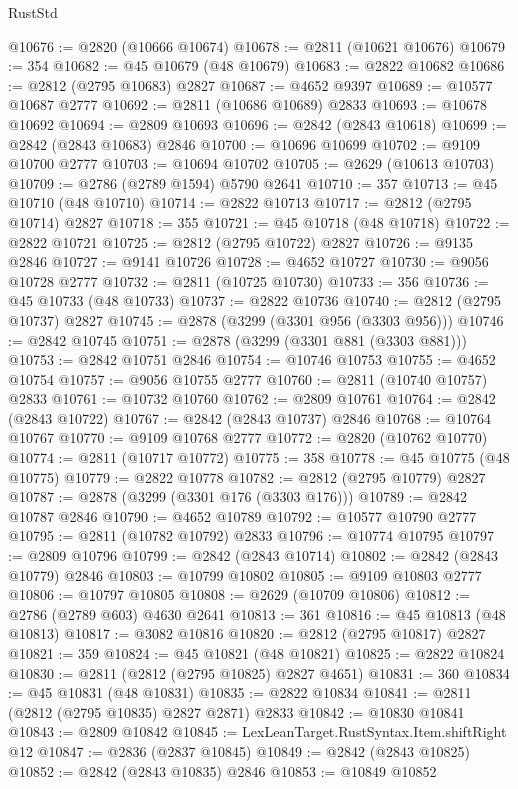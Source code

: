 \begin{lexlean}{RustStd}
\begin{coremodule}
@10676 := @2820 (@10666 @10674)
@10678 := @2811 (@10621 @10676)
@10679 := 354
@10682 := @45 @10679 (@48 @10679)
@10683 := @2822 @10682
@10686 := @2812 (@2795 @10683) @2827
@10687 := @4652 @9397
@10689 := @10577 @10687 @2777
@10692 := @2811 (@10686 @10689) @2833
@10693 := @10678 @10692
@10694 := @2809 @10693
@10696 := @2842 (@2843 @10618)
@10699 := @2842 (@2843 @10683) @2846
@10700 := @10696 @10699
@10702 := @9109 @10700 @2777
@10703 := @10694 @10702
@10705 := @2629 (@10613 @10703)
@10709 := @2786 (@2789 @1594) @5790 @2641
@10710 := 357
@10713 := @45 @10710 (@48 @10710)
@10714 := @2822 @10713
@10717 := @2812 (@2795 @10714) @2827
@10718 := 355
@10721 := @45 @10718 (@48 @10718)
@10722 := @2822 @10721
@10725 := @2812 (@2795 @10722) @2827
@10726 := @9135 @2846
@10727 := @9141 @10726
@10728 := @4652 @10727
@10730 := @9056 @10728 @2777
@10732 := @2811 (@10725 @10730)
@10733 := 356
@10736 := @45 @10733 (@48 @10733)
@10737 := @2822 @10736
@10740 := @2812 (@2795 @10737) @2827
@10745 := @2878 (@3299 (@3301 @956 (@3303 @956)))
@10746 := @2842 @10745
@10751 := @2878 (@3299 (@3301 @881 (@3303 @881)))
@10753 := @2842 @10751 @2846
@10754 := @10746 @10753
@10755 := @4652 @10754
@10757 := @9056 @10755 @2777
@10760 := @2811 (@10740 @10757) @2833
@10761 := @10732 @10760
@10762 := @2809 @10761
@10764 := @2842 (@2843 @10722)
@10767 := @2842 (@2843 @10737) @2846
@10768 := @10764 @10767
@10770 := @9109 @10768 @2777
@10772 := @2820 (@10762 @10770)
@10774 := @2811 (@10717 @10772)
@10775 := 358
@10778 := @45 @10775 (@48 @10775)
@10779 := @2822 @10778
@10782 := @2812 (@2795 @10779) @2827
@10787 := @2878 (@3299 (@3301 @176 (@3303 @176)))
@10789 := @2842 @10787 @2846
@10790 := @4652 @10789
@10792 := @10577 @10790 @2777
@10795 := @2811 (@10782 @10792) @2833
@10796 := @10774 @10795
@10797 := @2809 @10796
@10799 := @2842 (@2843 @10714)
@10802 := @2842 (@2843 @10779) @2846
@10803 := @10799 @10802
@10805 := @9109 @10803 @2777
@10806 := @10797 @10805
@10808 := @2629 (@10709 @10806)
@10812 := @2786 (@2789 @603) @4630 @2641
@10813 := 361
@10816 := @45 @10813 (@48 @10813)
@10817 := @3082 @10816
@10820 := @2812 (@2795 @10817) @2827
@10821 := 359
@10824 := @45 @10821 (@48 @10821)
@10825 := @2822 @10824
@10830 := @2811 (@2812 (@2795 @10825) @2827 @4651)
@10831 := 360
@10834 := @45 @10831 (@48 @10831)
@10835 := @2822 @10834
@10841 := @2811 (@2812 (@2795 @10835) @2827 @2871) @2833
@10842 := @10830 @10841
@10843 := @2809 @10842
@10845 := LexLeanTarget.RustSyntax.Item.shiftRight @12
@10847 := @2836 (@2837 @10845)
@10849 := @2842 (@2843 @10825)
@10852 := @2842 (@2843 @10835) @2846
@10853 := @10849 @10852

\end{coremodule}
\end{lexlean}
